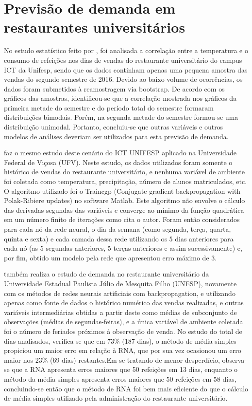 \documentclass[	12pt, Times, openright, twoside, a4paper, english, brazil]{abntex2}
\begin{document}
    \section{Previsão de demanda em restaurantes universitários}
         No estudo estatístico feito por \cite{Landim2016}, foi analisada a correlação entre a temperatura e o consumo de refeições nos dias de vendas do restaurante universitário do campus ICT da Unifesp, sendo que os dados continham apenas uma pequena amostra das vendas do segundo semestre de 2016. Devido ao baixo volume de ocorrências, os dados foram submetidos à reamostragem via bootstrap. De acordo com os gráficos das amostras, identificou-se que a correlação mostrada nos gráficos da primeira metade do semestre e do período total do semestre formaram distribuições bimodais. Porém, na segunda metade do semestre formou-se uma distribuição unimodal. Portanto, concluiu-se que outras variáveis e outros modelos de análises deveriam ser utilizados para esta previsão de demanda.
        
         \cite{Lopes2008} faz o mesmo estudo deste cenário do ICT UNIFESP aplicado na Universidade Federal de Viçosa (UFV). Neste estudo, os dados utilizados foram somente o histórico de vendas do restaurante universitário, e nenhuma variável de ambiente foi coletada como temperatura, precipitação, número de alunos matriculados, etc. O algoritmo utilizado foi o Traincgp (Conjugate gradient backpropagation with Polak-Ribiere updates) no software Matlab. Este algoritmo não envolve o cálculo das derivadas segundas das variáveis e converge ao mínimo da função quadrática em um número finito de iterações como cita o autor. Foram então considerados para cada nó da rede neural, o dia da semana (como segunda, terça, quarta, quinta e sexta) e cada camada dessa rede utilizando os 5 dias anteriores para cada nó (as 5 segundas anteriores, 5 terças anteriores e assim sucessivamente) e, por fim, obtido um modelo pela rede que apresentou erro máximo de 3.
        
         \cite{Rocha2011} também realiza o estudo de demanda no restaurante universitário da Universidade Estadual Paulista Júlio de Mesquita Filho (UNESP), novamente com os métodos de redes neurais artificiais com backpropagation, e utilizando apenas como fonte de dados o histórico numérico das vendas realizadas, e outras variáveis intermediárias obtidas a partir deste como médias de subconjunto de observações (médias de segundas-feiras), e a única variável de ambiente coletada foi o número de feriados próximos à observação de venda. No estudo do total de dias analisados, verifica-se que em 73\% (187 dias), o método de média simples propiciou um maior erro em relação à RNA, que por sua vez ocasionou um erro maior nos 23\% (69 dias) restantes.Em se tratando de menor desperdício, observa-se que a RNA apresenta erros maiores que 50 refeições em 13 dias, enquanto o método da média simples apresenta erros maiores que 50 refeições em 58 dias, concluindo-se então que o método de RNA foi bem mais eficiente do que o cálculo de média simples utilizado pela administração do restaurante universitário.
      
\end{document}
